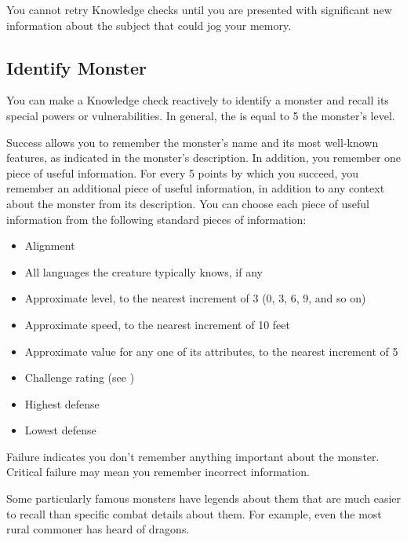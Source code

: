         You cannot retry Knowledge checks until you are presented with significant new information about the subject that could jog your memory.

    \subsection{Identify Monster}
        You can make a Knowledge check reactively to identify a monster and recall its special powers or vulnerabilities.
        In general, the  is equal to 5 \add the monster's level.

        Success allows you to remember the monster's name and its most well-known features, as indicated in the monster's description.
        In addition, you remember one piece of useful information.
        For every 5 points by which you succeed, you remember an additional piece of useful information, in addition to any context about the monster from its description.
        You can choose each piece of useful information from the following standard pieces of information:
        \begin{itemize}
            \item Alignment
            \item All languages the creature typically knows, if any
            \item Approximate level, to the nearest increment of 3 (0, 3, 6, 9, and so on)
            \item Approximate speed, to the nearest increment of 10 feet
            \item Approximate value for any one of its attributes, to the nearest increment of 5
            \item Challenge rating (see )
            \item Highest defense
            \item Lowest defense
        \end{itemize}

        Failure indicates you don't remember anything important about the monster.
        Critical failure may mean you remember incorrect information.

        Some particularly famous monsters have legends about them that are much easier to recall than specific combat details about them.
        For example, even the most rural commoner has heard of dragons.

